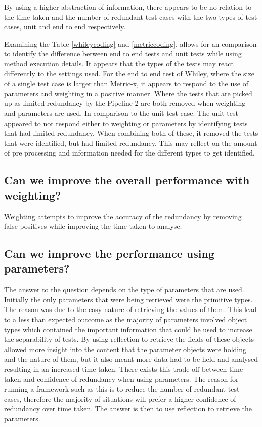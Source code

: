 By using a higher abstraction of information, there appears to be no relation to the time taken and the number of redundant test cases with the two types of test cases, unit and end to end respectively.

Examining the Table \ref{whileycoding} and \ref{metriccoding}, allows for an comparison to identify the difference between end to end tests and unit tests while using method execution details. It appears that the types of the tests may react differently to the settings used. For the end to end test of Whiley, where the size of a single test case is larger than Metric-x, it appears to respond to the use of parameters and weighting in a positive manner. Where the tests that are picked up as limited redundancy by the Pipeline 2 are both removed when weighting and parameters are used. In comparison to the unit test case. The unit test appeared to not respond either to weighting or parameters by identifying tests that had limited redundancy. When combining both of these, it removed the tests that were identified, but had limited redundancy.  This may reflect on the amount of pre processing and information needed for the different types to get identified. 


\subsection{Can we improve the overall performance with weighting?}
Weighting attempts to improve the accuracy of the redundancy by removing false-positives while improving the time taken to analyse. 


\subsection{Can we improve the performance using parameters?}

The answer to the question depends on the type of parameters that are used. Initially the only parameters that were being retrieved were the primitive types. The reason was due to the easy nature of retrieving the values of them. This lead to a less than expected outcome as the majority of parameters involved object types which contained the important information that could be used to increase the separability of tests. By using reflection to retrieve the fields of these objects allowed more insight into the content that the parameter objects were holding and the nature of them, but it also meant more data had to be held and analysed resulting in an increased time taken. There exists this trade off between time taken and confidence of redundancy when using parameters. The reason for running a framework such as this is to reduce the number of redundant test cases, therefore the majority of situations will prefer a higher confidence of redundancy over time taken. The answer is then to use reflection to retrieve the parameters.

